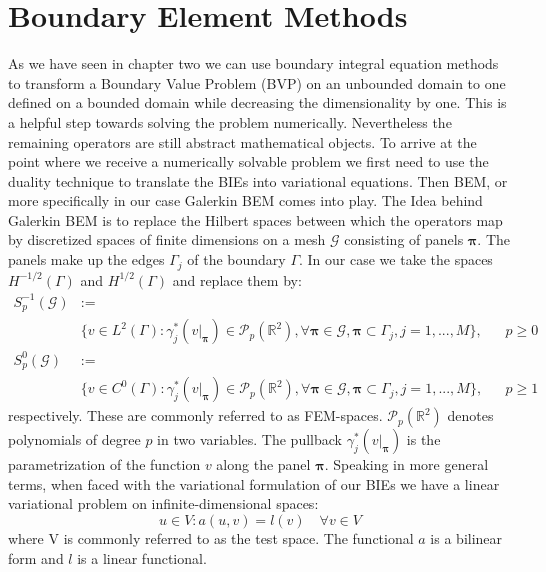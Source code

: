 \documentclass[a4paper, oneside]{thirdparty_stylesheets/discothesis}
\begin{document}
\section{Boundary Element Methods} \label{gbem}
As we have seen in chapter two we can use boundary integral equation methods to transform a Boundary Value Problem (BVP) on an unbounded domain to one defined on a bounded domain while decreasing the dimensionality by one. 
This is a helpful step towards solving the problem numerically.
Nevertheless the remaining operators are still abstract mathematical objects.
To arrive at the point where we receive a numerically solvable problem we first need to use the duality technique to translate the BIEs into variational equations.
Then BEM, or more specifically in our case Galerkin BEM comes into play.
The Idea behind Galerkin BEM is to replace the Hilbert spaces between which the operators map by discretized spaces of finite dimensions on a mesh $\mathcal{G}$ consisting of panels $\boldsymbol{\pi}$.
The panels make up the edges $\Gamma_j$ of the boundary $\Gamma$. 
In our case we take the spaces $H^{-1/2}(\Gamma)$ and $H^{1/2}(\Gamma)$ and replace them by:
\begin{align}
	S_p^{-1}(\mathcal{G}) &:= \label{eq:FEMsp1} \\ 
						  &\{ v \in L^2(\Gamma): \gamma_j^*(v|_{\boldsymbol{\pi}}) \in \mathcal{P}_p(\mathbb{R}^2), \forall \boldsymbol{\pi} \in \mathcal{G}, \boldsymbol{\pi} \subset \Gamma_j, j=1,...,M\}, & &p \geq 0 \nonumber \\
	S_p^0(\mathcal{G}) &:= \label{eq:FEMsp2} \\ 
					   &\{ v \in C^0(\Gamma): \gamma_j^*(v|_{\boldsymbol{\pi}}) \in \mathcal{P}_p(\mathbb{R}^2), \forall \boldsymbol{\pi} \in \mathcal{G}, \boldsymbol{\pi} \subset \Gamma_j, j=1,...,M\}, & &p \geq 1 \nonumber
\end{align}
respectively.
These are commonly referred to as FEM-spaces.
$\mathcal{P}_p(\mathbb{R}^2)$ denotes polynomials of degree $p$ in two variables.
The pullback $\gamma_j^*(v|_{\boldsymbol{\pi}})$ is the parametrization of the function $v$ along the panel $\boldsymbol{\pi}$.
Speaking in more general terms, when faced with the variational formulation of our BIEs we have a linear variational problem on infinite-dimensional spaces:
\begin{equation}
	u \in V: a(u,v) = l(v) \quad \forall v \in V \label{eq:linvar}
\end{equation}
where V is commonly referred to as the test space.
The functional $a$ is a bilinear form and $l$ is a linear functional.
\end{document}

